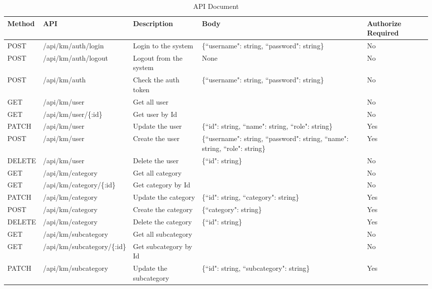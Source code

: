\documentclass[12pt,oneside,openright,a4paper]{cpe-english-project}
\begin{document}
\begin{table}[h]
	\centering
	\caption{API Document}
	\label{tab:api_document}
	\begin{adjustbox}{width=\textwidth}
		\begin{tabular}{|l|l|l|l|l|}
		\hline
		Method 	& API 						& Description 				& Body 											 & Authorize Required \\ \hline
		POST	& /api/km/auth/login 		& Login to the system 		& \{``username": string, ``password": string\} 		 & No \\ \hline
		POST	& /api/km/auth/logout 		& Logout from the system 	& None 											 & No \\ \hline
		POST	& /api/km/auth 				& Check the auth token 		& \{``username": string, ``password": string\} 		 & No \\ \hline
		GET		& /api/km/user 				& Get all user 				& 												 & No \\ \hline
		GET		& /api/km/user/\{:id\} 		& Get user by Id 			& 												 & No \\ \hline
		PATCH	& /api/km/user 				& Update the user 			& \{``id": string, ``name": string, ``role": string\} & Yes \\ \hline
		POST	& /api/km/user 				& Create the user 			& \{``username": string, ``password": string, ``name": string, ``role": string\} & Yes \\ \hline
		DELETE	& /api/km/user 				& Delete the user 			& \{``id": string\} 								& No \\ \hline
		GET		& /api/km/category 			& Get all category 			& 												& No \\ \hline
		GET		& /api/km/category/\{:id\} 	& Get category by Id 		& 												& No \\ \hline
		PATCH	& /api/km/category 			& Update the category 		& \{``id": string, ``category": string\}			& Yes \\ \hline
		POST	& /api/km/category 			& Create the category 		& \{``category": string\} 							& Yes \\ \hline
		DELETE	& /api/km/category 			& Delete the category 		& \{``id": string\} 								& Yes \\ \hline
		GET		& /api/km/subcategory 		& Get all subcategory 		& 												& No \\ \hline
		GET		& /api/km/subcategory/\{:id\} & Get subcategory by Id 	& 												& No \\ \hline
		PATCH	& /api/km/subcategory 		& Update the subcategory 	& \{``id": string, ``subcategory": string\}			& Yes \\ \hline

\end{tabular}
\end{adjustbox}
\end{table}
\end{document}
